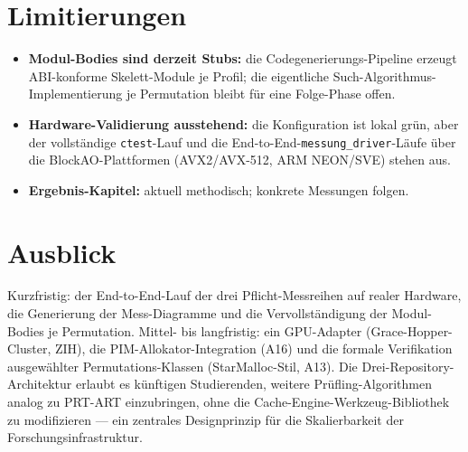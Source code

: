 \section{Limitierungen}\label{sec:limitations}

\begin{itemize}
  \item \textbf{Modul-Bodies sind derzeit Stubs:} die Codegenerierungs-Pipeline erzeugt
        ABI-konforme Skelett-Module je Profil; die eigentliche Such-Algorithmus-Implementierung
        je Permutation bleibt für eine Folge-Phase offen.
  \item \textbf{Hardware-Validierung ausstehend:} die Konfiguration ist lokal grün, aber der
        vollständige \texttt{ctest}-Lauf und die End-to-End-\texttt{messung\_driver}-Läufe über
        die BlockAO-Plattformen (AVX2/AVX-512, ARM NEON/SVE) stehen aus.
  \item \textbf{Ergebnis-Kapitel:} aktuell methodisch; konkrete Messungen folgen.
\end{itemize}

\section{Ausblick}\label{sec:outlook}

Kurzfristig: der End-to-End-Lauf der drei Pflicht-Messreihen auf realer Hardware, die
Generierung der Mess-Diagramme und die Vervollständigung der Modul-Bodies je Permutation.
Mittel- bis langfristig: ein GPU-Adapter (Grace-Hopper-Cluster, ZIH), die
PIM-Allokator-Integration (A16) und die formale Verifikation ausgewählter Permutations-Klassen
(StarMalloc-Stil, A13). Die Drei-Repository-Architektur erlaubt es künftigen Studierenden,
weitere Prüfling-Algorithmen analog zu PRT-ART einzubringen, ohne die
Cache-Engine-Werkzeug-Bibliothek zu modifizieren --- ein zentrales Designprinzip für die
Skalierbarkeit der Forschungsinfrastruktur.
